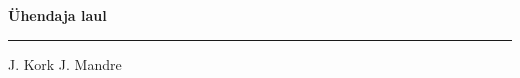 \documentclass[10pt]{book}
\begin{document}
{
  \samepage
  \raggedbottom
  \raggedright
  \sloppy


  \vspace{0.2in}

  \noindent\begin{minipage}{.1\textwidth}
    \hfill\vspace{0.1in}
  \end{minipage}%
  \noindent\begin{minipage}{.8\textwidth}
    \centering
    \bfseries
    \large \"Uhendaja laul
  \end{minipage}%
  \noindent\begin{minipage}{.1\textwidth}
      \hfill\vspace{0.1in}
  \end{minipage}

  \nopagebreak[4]
  \vspace{0.1in}
  \nopagebreak[4]
  \hrule height 0.05ex
  \nopagebreak[4]
  \vspace{-0.05in}

  {\footnotesize J. Kork \hfill J. Mandre }\\
  \vspace{0.01in}



}
\end{document}
